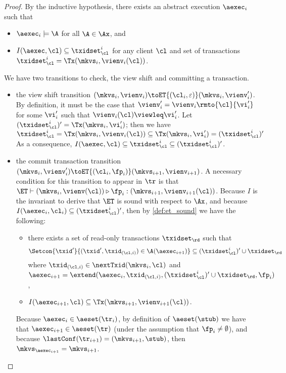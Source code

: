 \begin{proof}
By the inductive hypothesis, there exists an abstract execution $\aexec_i$ such that  
\begin{itemize}
\item $\aexec_{i} \models \A$ for all $\A \in \Ax$, and 
\item $I(\aexec, \cl) \subseteq \txidset_{\cl}^{i}$ for any client $\cl$ and set of transactions $\txidset_{\cl}^{i} = \Tx(\mkvs_{i}, \vienv_{i}(\cl))$.
\end{itemize}

We have two transitions to check, the view shift and committing a transaction.
\begin{itemize}
\item the view shift transition $(\mkvs_{i}, \vienv_{i}) \toET{(\cl_{i}, \varepsilon)} (\mkvs_{i}, \vienv'_{i})$. 
By definition, it must be the case that $\vienv'_{i} = \vienv_{i}\rmto{\cl}{\vi'_{i}}$ 
for some $\vi'_{i}$ such that $\vienv_{i}(\cl) \viewleq \vi'_{i}$.
Let $(\txidset_{\cl}^{i})' = \Tx(\mkvs_{i}, \vi'_{i})$; then we have 
\(
\txidset_{\cl}^{i} = \Tx(\mkvs_{i}, \vienv_{i}(\cl)) \subseteq \Tx(\mkvs_{i}, \vi'_{i}) = (\txidset_{\cl}^{i})'
\)
As a consequence, $I(\aexec, \cl) \subseteq \txidset_{\cl}^{i} \subseteq (\txidset_{\cl}^{i})'$.

\item the commit transaction transition $(\mkvs_{i}, \vienv_{i}') \toET{(\cl_{i}, \fp_{i})}
(\mkvs_{i+1}, \vienv_{i+1})$.
A necessary condition for this transition 
to appear in $\tr$ is that $\ET \vdash (\mkvs_{i}, \vienv(\cl)) \triangleright \fp_{i}: (\mkvs_{i+1},\vienv_{i+1}(\cl))$. 
Because $I$ is the invariant to derive that $\ET$ is sound with respect to $\Ax$, 
and because $I(\aexec_{i}, \cl_{i}) \subseteq (\txidset^{i}_{\cl})'$, 
then by \cref{def:et_sound} we have the following:
\begin{itemize}
\item there exists a set of read-only transactions $\txidset_\rd$ 
    such that 
    \[
        \Setcon{\txid' }{ (\txid', \txid_{(\cl, i)}) \in \A(\aexec_{i+1})} \subseteq (\txidset^{i}_{\cl})' \cup \txidset_\rd
    \]
where 
$\txid_{(\cl, i)} \in \nextTxid(\mkvs_{i}, \cl)$
and $\aexec_{i+1} = \extend(\aexec_{i}, \txid_{(\cl, i)}, (\txidset^{i}_{\cl})' \cup \txidset_\rd, \fp_{i})$,
\item  $I(\aexec_{i+1}, \cl) \subseteq \Tx(\mkvs_{i+1}, \vienv_{i+1}(\cl))$.
\end{itemize} 
Because $\aexec_{i} \in \aeset(\tr_{i})$, by definition of $\aeset(\stub)$ we have that 
$\aexec_{i+1} \in \aeset(\tr)$ (under the assumption that $\fp_{i} \neq \emptyset$), 
and because $\lastConf(\tr_{i+1}) = (\mkvs_{i+1}, \stub)$, then $\mkvs_{\aexec_{i+1}} = \mkvs_{i+1}$. 


\end{itemize}
\end{proof}
